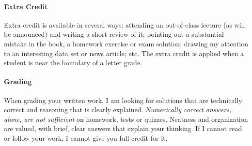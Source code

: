 \documentclass[11pt]{article}
\begin{document}
\paragraph{Extra Credit}
Extra credit is available in several ways: attending an out-of-class lecture (as will be announced) and writing a short review of it; pointing out a substantial mistake in the book, a homework exercise or exam solution; drawing my attention to an interesting data set or news article; etc. The extra credit is applied when a student is near the boundary of a letter grade.

\paragraph{Grading}
When grading your written work, I am looking for solutions that are technically correct and reasoning that is clearly explained.  \emph{Numerically correct answers, alone, are not sufficient} on homework, tests or quizzes.  Neatness and organization are valued, with brief, clear answers that explain your thinking.  If I cannot read or follow your work, I cannot give you full credit for it.
\end{document}
